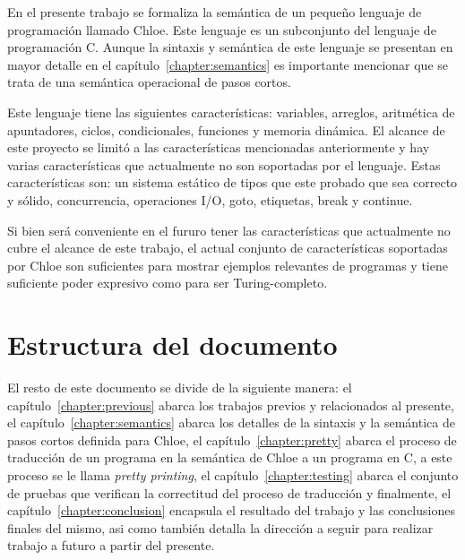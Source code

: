 En el presente trabajo se formaliza la semántica de un pequeño lenguaje de programación llamado Chloe.
Este lenguaje es un subconjunto del lenguaje de programación C.
Aunque la sintaxis y semántica de este lenguaje se presentan en mayor detalle en el capítulo~\ref{chapter:semantics} es importante mencionar que se trata de una semántica operacional de pasos cortos.

Este lenguaje tiene las siguientes características: variables, arreglos, aritmética de apuntadores, ciclos, condicionales, funciones y memoria dinámica.
El alcance de este proyecto se limitó a las características mencionadas anteriormente y hay varias características que actualmente no son soportadas por el lenguaje.
Estas características son: un sistema estático de tipos que este probado que sea correcto y sólido, concurrencia, operaciones I/O, goto, etiquetas, break y continue.

Si bien será conveniente en el fururo tener las características que actualmente no cubre el alcance de este trabajo, el actual conjunto de características soportadas por Chloe son suficientes para mostrar ejemplos relevantes de programas y tiene suficiente poder expresivo como para ser Turing-completo.


\section{Estructura del documento}\label{section:document_structure}

El resto de este documento se divide de la siguiente manera: el capítulo~\ref{chapter:previous} abarca los trabajos previos y relacionados al presente, el capítulo~\ref{chapter:semantics} abarca los detalles de la sintaxis y la semántica de pasos cortos definida para Chloe, el capítulo~\ref{chapter:pretty} abarca el proceso de traducción de un programa en la semántica de Chloe a un programa en C, a este proceso se le llama \textit{pretty printing}, el capítulo~\ref{chapter:testing} abarca el conjunto de pruebas que verifican la correctitud del proceso de traducción y finalmente, el capítulo~\ref{chapter:conclusion} encapsula el resultado del trabajo y las conclusiones finales del mismo, asi como también detalla la dirección a seguir para realizar trabajo a futuro a partir del presente.
